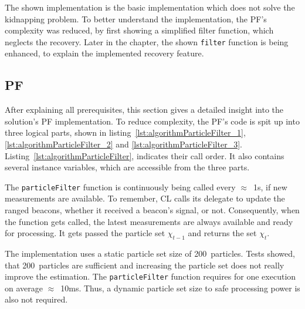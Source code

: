 The shown implementation is the basic implementation which does not solve the kidnapping problem. To better understand the implementation, the \acs{PF}'s complexity was reduced, by first showing a simplified filter function, which neglects the recovery. Later in the chapter, the shown \texttt{filter} function is being enhanced, to explain the implemented recovery feature.




\subsection{\acl{PF}}
After explaining all prerequisites, this section gives a detailed insight into the solution's \acl{PF} implementation. To reduce complexity, the \acs{PF}'s code is spit up into three logical parts, shown in listing~\ref{lst:algorithmParticleFilter_1}, \ref{lst:algorithmParticleFilter_2} and \ref{lst:algorithmParticleFilter_3}. Listing~\ref{lst:algorithmParticleFilter}, indicates their call order. It also contains several instance variables, which are accessible from the three parts.

The \texttt{particleFilter} function is continuously being called every $\approx$~1s, if new measurements are available. To remember, \ac{CL} calls its delegate to update the ranged beacons, whether it received a beacon's signal, or not. Consequently, when the function gets called, the latest measurements are always available and ready for processing. It gets passed the particle set $\chi_{t-1}$ and returns the set $\chi_t$.

The implementation uses a static particle set size of 200~particles. Tests showed, that 200~particles are sufficient and increasing the particle set does not really improve the estimation. The \texttt{particleFilter} function requires for one execution on average $\approx$~10ms. Thus, a dynamic particle set size to safe processing power is also not required.




